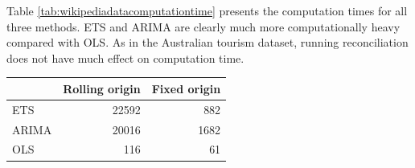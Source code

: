 \documentclass[11pt,a4paper,]{article}
\let\origtable\table
\let\endorigtable\endtable
\renewenvironment{table}[1][2] {
    \expandafter\origtable\expandafter[!htbp]
} {
    \endorigtable
}
\begin{document}
Table \ref{tab:wikipediadatacomputationtime} presents the computation times for all three methods. ETS and ARIMA are clearly much more computationally heavy compared with OLS. As in the Australian tourism dataset, running reconciliation does not have much effect on computation time.

\begin{table}

\caption{\label{tab:wikipediadatacomputationtime}Computation time (seconds) for ETS, ARIMA and OLS with reconciliation - Rolling and fixed origin forecasts - Wikipedia dataset}
\centering
\begin{tabular}[t]{lrr}
\toprule
 & Rolling origin & Fixed origin\\
\midrule
ETS & 22592 & 882\\
ARIMA & 20016 & 1682\\
OLS & 116 & 61\\
\bottomrule
\end{tabular}
\end{table}

\clearpage

\printbibliography
\end{document}
